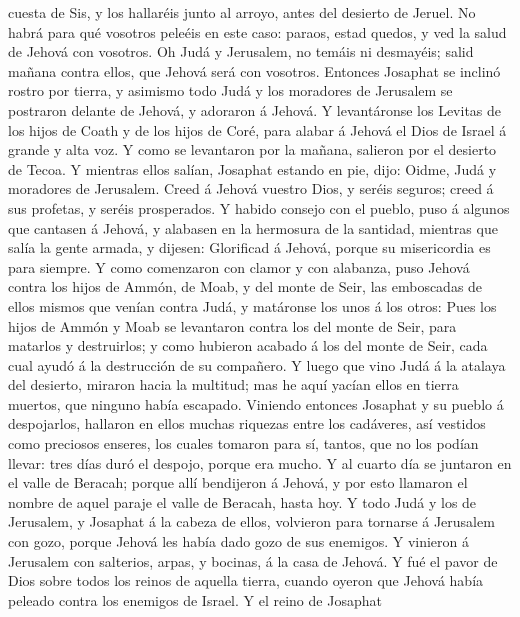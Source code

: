 cuesta de Sis, y los hallaréis junto al arroyo, antes del desierto de
Jeruel.  No habrá para qué vosotros peleéis en este caso:
paraos, estad quedos, y ved la salud de Jehová con vosotros. Oh Judá y
Jerusalem, no temáis ni desmayéis; salid mañana contra ellos, que Jehová
será con vosotros.  Entonces Josaphat se inclinó rostro
por tierra, y asimismo todo Judá y los moradores de Jerusalem se
postraron delante de Jehová, y adoraron á Jehová.  Y
levantáronse los Levitas de los hijos de Coath y de los hijos de Coré,
para alabar á Jehová el Dios de Israel á grande y alta voz.
 Y como se levantaron por la mañana, salieron por el
desierto de Tecoa. Y mientras ellos salían, Josaphat estando en pie,
dijo: Oidme, Judá y moradores de Jerusalem. Creed á Jehová vuestro Dios,
y seréis seguros; creed á sus profetas, y seréis prosperados.
 Y habido consejo con el pueblo, puso á algunos que
cantasen á Jehová, y alabasen en la hermosura de la santidad, mientras
que salía la gente armada, y dijesen: Glorificad á Jehová, porque su
misericordia es para siempre.  Y como comenzaron con
clamor y con alabanza, puso Jehová contra los hijos de Ammón, de Moab, y
del monte de Seir, las emboscadas de ellos mismos que venían contra
Judá, y matáronse los unos á los otros:  Pues los hijos
de Ammón y Moab se levantaron contra los del monte de Seir, para
matarlos y destruirlos; y como hubieron acabado á los del monte de Seir,
cada cual ayudó á la destrucción de su compañero.  Y
luego que vino Judá á la atalaya del desierto, miraron hacia la
multitud; mas he aquí yacían ellos en tierra muertos, que ninguno había
escapado.  Viniendo entonces Josaphat y su pueblo á
despojarlos, hallaron en ellos muchas riquezas entre los cadáveres, así
vestidos como preciosos enseres, los cuales tomaron para sí, tantos, que
no los podían llevar: tres días duró el despojo, porque era mucho.
 Y al cuarto día se juntaron en el valle de Beracah;
porque allí bendijeron á Jehová, y por esto llamaron el nombre de aquel
paraje el valle de Beracah, hasta hoy.  Y todo Judá y los
de Jerusalem, y Josaphat á la cabeza de ellos, volvieron para tornarse á
Jerusalem con gozo, porque Jehová les había dado gozo de sus enemigos.
 Y vinieron á Jerusalem con salterios, arpas, y bocinas,
á la casa de Jehová.  Y fué el pavor de Dios sobre todos
los reinos de aquella tierra, cuando oyeron que Jehová había peleado
contra los enemigos de Israel.  Y el reino de Josaphat
